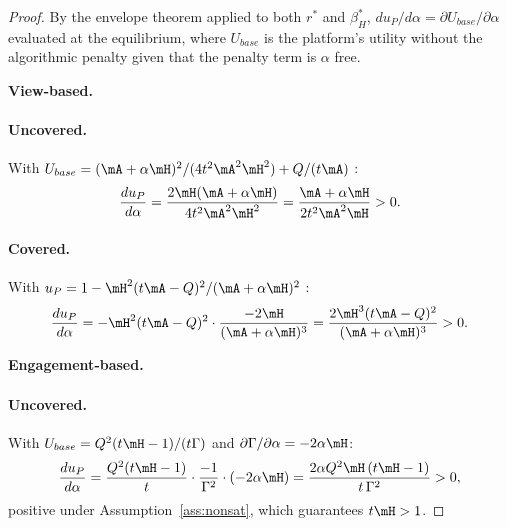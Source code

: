\begin{proof}
By the envelope theorem applied to both $r^*$ and $\beta_H^*$, 
$du_P/d\alpha = \partial U_{base}/\partial\alpha$ evaluated at the equilibrium, where $U_{base}$ is the platform's utility without the algorithmic penalty given that the penalty term is $\alpha$ free.

\medskip
\textbf{View-based.}\\
\paragraph{Uncovered.}
With $U_{base} = (\mA + \alpha \mH)^2/(4t^2\mA^2\mH^2) + Q/(t\mA)$ :
\[
\frac{du_P}{d\alpha} 
= \frac{2\mH(\mA+\alpha \mH)}{4t^2\mA^2\mH^2} 
= \frac{\mA + \alpha \mH}{2t^2\mA^2\mH} > 0.
\]

\medskip
\paragraph{Covered.}\;
With $u_P = 1 - \mH^2 (t\mA-Q)^2/(\mA+\alpha\mH)^2$ :
\[
\frac{du_P}{d\alpha}
= -\mH^2 (t\mA-Q)^2 \cdot \frac{-2\mH}{(\mA+\alpha\mH)^3}
= \frac{2\mH^3 (t\mA-Q)^2}{(\mA+\alpha\mH)^3} > 0.
\]

\medskip
\textbf{Engagement-based.}\\
\paragraph{Uncovered.}
With $U_{base} = Q^2(t\mH - 1)/(t\Gamma)$ and 
$\partial\Gamma/\partial\alpha = -2\alpha\mH$:
\[
\frac{du_P}{d\alpha}
= \frac{Q^2(t\mH-1)}{t} \cdot \frac{-1}{\Gamma^2}\cdot(-2\alpha\mH)
= \frac{2\alpha Q^2\mH\,(t\mH-1)}{t\,\Gamma^2} > 0,
\]
positive under Assumption~\ref{ass:nonsat}, which guarantees 
$t\mH > 1$.

\medskip

\end{proof}
